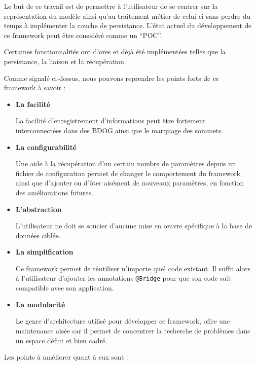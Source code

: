 \documentclass[a4paper,fleqn,12pt,oneside]{report}
\begin{document}
Le but de ce travail est de permettre à l'utilisateur de se centrer sur la représentation du modèle ainsi qu'au traitement métier de celui-ci sans perdre du temps à implémenter la couche de persistance. L'état actuel du développement de ce framework peut être considéré comme un \enquote{POC}.

Certaines fonctionnalités ont d'ores et déjà été implémentées telles que la persistance, la liaison et la récupération.

Comme signalé ci-dessus, nous pouvons reprendre les points forts de ce framework à savoir :

\begin{itemize}
\item \textbf{La facilité}

\quad La facilité d'enregistrement d'informations peut être fortement interconnectées dans des BDOG ainsi que le marquage des sommets.

\item \textbf{La configurabilité}

\quad Une aide à la récupération d'un certain nombre de paramètres depuis un fichier de configuration permet de changer le comportement du framework ainsi que d'ajouter ou d'ôter aisément de nouveaux paramètres, en fonction des améliorations futures.

\item \textbf{L'abstraction}

\quad L'utilisateur ne doit se soucier d'aucune mise en œuvre spécifique à la base de données ciblée. 

\item \textbf{La simplification}

\quad Ce framework permet de réutiliser n'importe quel code existant. Il suffit alors à l'utilisateur d'ajouter les annotations \texttt{@Bridge} pour que son code soit compatible avec son application.

\item \textbf{La modularité}

\quad Le genre d'architecture utilisé pour développer ce framework, offre une maintenance aisée car il permet de concentrer la recherche de problèmes dans un espace défini et bien cadré.

\end{itemize}
\newpage
Les points à améliorer quant à eux sont :
\end{document}
